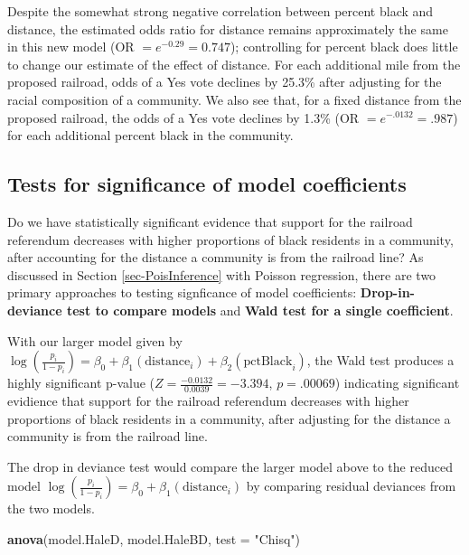 \documentclass[
]{krantz}
\newenvironment{Shaded}{\begin{snugshade}}{\end{snugshade}}
\newcommand{\DataTypeTok}[1]{\textcolor[rgb]{0.27,0.27,0.27}{#1}}
\newcommand{\KeywordTok}[1]{\textcolor[rgb]{0.27,0.27,0.27}{\textbf{#1}}}
\newcommand{\NormalTok}[1]{#1}
\newcommand{\StringTok}[1]{\textcolor[rgb]{0.5,0.5,0.5}{#1}}
\begin{document}
Despite the somewhat strong negative correlation between percent black and distance, the estimated odds ratio for distance remains approximately the same in this new model (OR \(= e^{-0.29} = 0.747\)); controlling for percent black does little to change our estimate of the effect of distance. For each additional mile from the proposed railroad, odds of a Yes vote declines by 25.3\% after adjusting for the racial composition of a community. We also see that, for a fixed distance from the proposed railroad, the odds of a Yes vote declines by 1.3\% (OR \(= e^{-.0132} = .987\)) for each additional percent black in the community.

\hypertarget{sec-logisticInf}{%
\subsection{Tests for significance of model coefficients}\label{sec-logisticInf}}

Do we have statistically significant evidence that support for the railroad referendum decreases with higher proportions of black residents in a community, after accounting for the distance a community is from the railroad line? As discussed in Section \ref{sec-PoisInference} with Poisson regression, there are two primary approaches to testing signficance of model coefficients: \textbf{Drop-in-deviance test to compare models} and \textbf{Wald test for a single coefficient}.

With our larger model given by \(\log\left(\frac{p_i}{1-p_i}\right) = \beta_0+\beta_1(\textrm{distance}_i)+\beta_2(\textrm{pctBlack}_i)\), the Wald test produces a highly significant p-value (\(Z=\frac{-0.0132}{0.0039}= -3.394\), \(p=.00069\)) indicating significant evidience that support for the railroad referendum decreases with higher proportions of black residents in a community, after adjusting for the distance a community is from the railroad line.

The drop in deviance test would compare the larger model above to the reduced model \(\log\left(\frac{p_i}{1-p_i}\right) = \beta_0+\beta_1(\textrm{distance}_i)\) by comparing residual deviances from the two models.

\begin{Shaded}
\begin{Highlighting}[]
\KeywordTok{anova}\NormalTok{(model.HaleD, model.HaleBD, }\DataTypeTok{test =} \StringTok{"Chisq"}\NormalTok{)}
\end{Highlighting}
\end{Shaded}
\end{document}
